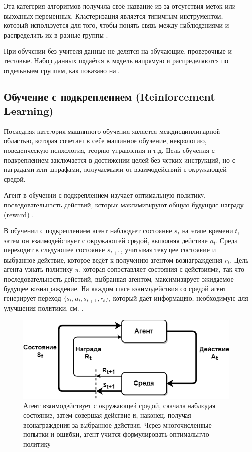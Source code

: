 Эта категория алгоритмов получила своё название из-за отсутствия меток или выходных переменных. Кластеризация является типичным инструментом, который используется для того, чтобы понять связь между наблюдениями и распределить их в разные группы \cite{hastie2001elements}.

При обучении без учителя данные не делятся на обучающие, проверочные и тестовые. Набор данных подаётся в модель напрямую и распределяются по отдельныем группам, как показано на .


\subsection{Обучение с подкреплением (Reinforcement Learning)}

Последняя категория машинного обучения является междисциплинарной областью, которая сочетает в себе машинное обучение, неврологию, поведенческую психология, теорию управления и т.д. Цель обучения с подкреплением заключается в достижении целей без чётких инструкций, но с наградами или штрафами, получаемыми от взаимодействий с окружающей средой.

Агент в обучении с подкреплением изучает оптимальную политику, последовательность действий, которые максимизируют общую будущую награду (reward) \cite{SuttonAndBarto-RL-Introduction-p2}.

В обучении с подкреплением агент наблюдает состояние ${s_t}$ на этапе времени ${t}$, затем он взаимодействует с окружающей средой, выполняя действие ${a_t}$. Среда переходит в следующее состояние ${s_{t+1}}$, учитывая текущее состояние и выбранное действие, которое ведёт к получению агентом вознаграждения ${r_t}$. Цель агента узнать политику $\pi$, которая сопоставляет состояния с действиями, так что последовательность действий, выбранная агентом, максимизирует ожидаемое будущее вознаграждение. На каждом шаге взаимодействия со средой агент генерирует переход ${\{s_t, a_t, s_{t+1}, r_t\}}$, который даёт информацию, необходимую для улучшения политики, см. .

\begin{figure}[ht!] 
	\center
	\includegraphics [scale=0.60] {my_folder/images/ch1/rl-flow.png}
	\caption{Агент взаимодействует с окружающей средой, сначала наблюдая состояние, затем совершая действие и, наконец, получая вознаграждения за выбранное действия. Через многочисленные попытки и ошибки, агент учится формулировать оптимальную политику \cite{SuttonAndBarto-RL-Introduction-p50}} 
	\label{fig:ch1-RL-flow}
\end{figure}
